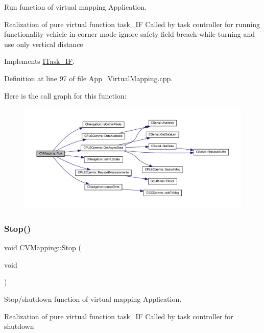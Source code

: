 Run function of virtual mapping Application. 

Realization of pure virtual function task\+\_\+\+IF Called by task controller for running functionality vehicle in corner mode ignore safety field breach while turning and use only vertical distance 

Implements \mbox{\hyperlink{class_i_task___i_f_ab73cc5879a61d00fc59b72cce32cc6f7}{I\+Task\+\_\+\+IF}}.



Definition at line 97 of file App\+\_\+\+Virtual\+Mapping.\+cpp.

Here is the call graph for this function\+:
\nopagebreak
\begin{figure}[H]
\begin{center}
\leavevmode
\includegraphics[width=350pt]{class_c_v_mapping_a8f064fcfd01953d7072efd5de23f89ef_cgraph}
\end{center}
\end{figure}
\mbox{\label{class_c_v_mapping_ad4e34f79b444109d0cbf1223881126dc}} 
\subsubsection{\texorpdfstring{Stop()}{Stop()}}
{\footnotesize\ttfamily void C\+V\+Mapping\+::\+Stop (\begin{DoxyParamCaption}\item[{void}]{ }\end{DoxyParamCaption})\hspace{0.3cm}{\ttfamily [virtual]}}



Stop/shutdown function of virtual mapping Application. 

Realization of pure virtual function task\+\_\+\+IF Called by task controller for shutdown 

